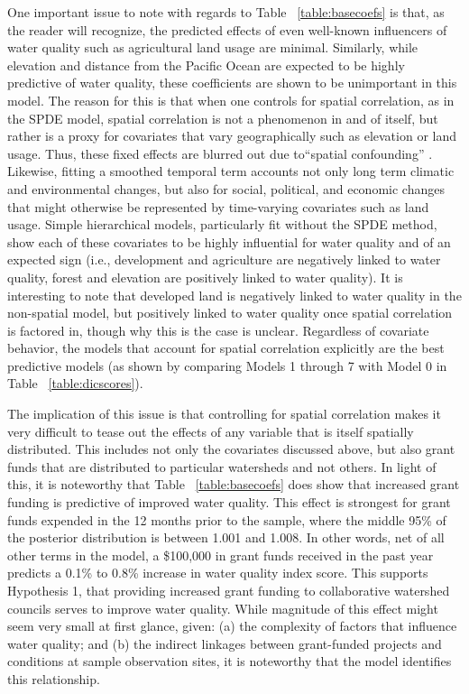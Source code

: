 \documentclass[11pt,a4paper,titlepage]{article}
\begin{document}


One important issue to note with regards to Table ~\ref{table:basecoefs} is that, as the reader will recognize, the predicted effects of even well-known influencers of water quality such as agricultural land usage are minimal. Similarly, while elevation and distance from the Pacific Ocean are expected to be highly predictive of water quality, these coefficients are shown to be unimportant in this model. The reason for this is that when one controls for spatial correlation, as in the SPDE model, spatial correlation is not a phenomenon in and of itself, but rather is a proxy for covariates that vary geographically such as elevation or land usage. Thus, these fixed effects are blurred out due to``spatial confounding'' \parencite{hodges2014}. Likewise, fitting a smoothed temporal term accounts not only long term climatic and environmental changes, but also for social, political, and economic changes that might otherwise be represented by time-varying covariates such as land usage. Simple hierarchical models, particularly fit without the SPDE method, show each of these covariates to be highly influential for water quality and of an expected sign (i.e., development and agriculture are negatively linked to water quality, forest and elevation are positively linked to water quality). It is interesting to note that developed land is negatively linked to water quality in the non-spatial model, but positively linked to water quality once spatial correlation is factored in, though why this is the case is unclear. Regardless of covariate behavior, the models that account for spatial correlation explicitly are the best predictive models (as shown by comparing Models 1 through 7 with Model 0 in Table ~\ref{table:dicscores}).

The implication of this issue is that controlling for spatial correlation makes it very difficult to tease out the effects of any variable that is itself spatially distributed. This includes not only the covariates discussed above, but also grant funds that are distributed to particular watersheds and not others. In light of this, it is noteworthy that Table ~\ref{table:basecoefs} does show that increased grant funding is predictive of improved water quality. This effect is strongest for grant funds expended in the 12 months prior to the sample, where the middle 95\% of the posterior distribution is between 1.001 and 1.008. In other words, net of all other terms in the model, a \$100,000 in grant funds received in the past year predicts a 0.1\% to 0.8\% increase in water quality index score. This supports Hypothesis 1, that providing increased grant funding to collaborative watershed councils serves to improve water quality. While magnitude of this effect might seem very small at first glance, given: (a) the complexity of factors that influence water quality; and (b) the indirect linkages between grant-funded projects and conditions at sample observation sites, it is noteworthy that the model identifies this relationship. 
\end{document}
